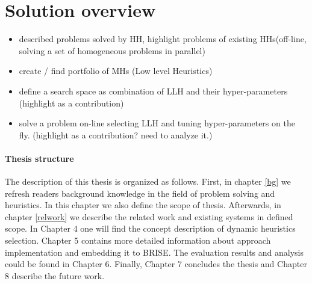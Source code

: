 \section{Solution overview}

\begin{itemize}
	\item described problems solved by HH, highlight problems of existing HHs(off-line, solving a set of homogeneous problems in parallel)
	\item create / find portfolio of MHs (Low level Heuristics)
	\item define a search space as combination of LLH and their hyper-parameters (highlight as a contribution)
	\item solve a problem on-line selecting LLH and tuning hyper-parameters on the fly. (highlight as a contribution? need to analyze it.)
\end{itemize}

\paragraph{Thesis structure}
The description of this thesis is organized as follows. First, in chapter \ref{bg} we refresh readers background knowledge in the field of problem solving and heuristics. In this chapter we also define the scope of thesis. Afterwards, in chapter \ref{relwork} we describe the related work and existing systems in defined scope. In Chapter 4 one will find the concept description of dynamic heuristics selection. Chapter 5 contains more detailed information about approach implementation and  embedding it to BRISE. The evaluation results and analysis could be found in Chapter 6. Finally, Chapter 7 concludes the thesis and Chapter 8 describe the future work.

